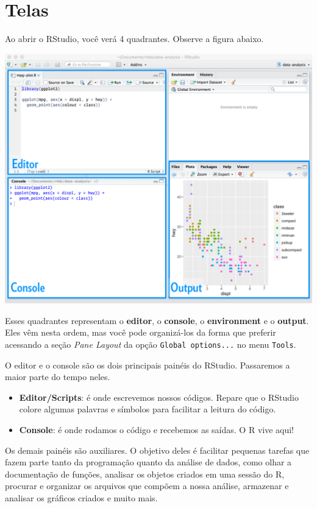 \documentclass[]{book}
\providecommand{\tightlist}{%
  \setlength{\itemsep}{0pt}\setlength{\parskip}{0pt}}
\begin{document}
\hypertarget{telas}{%
\section{Telas}\label{telas}}

Ao abrir o RStudio, você verá 4 quadrantes. Observe a figura abaixo.

\begin{center}\includegraphics[width=56.24in]{img/rstudio/rstudio-editor} \end{center}

Esses quadrantes representam o \textbf{editor}, o \textbf{console}, o \textbf{environment} e o \textbf{output}. Eles vêm nesta ordem, mas você pode organizá-los da forma que preferir acessando a seção \emph{Pane Layout} da opção \texttt{Global\ options...} no menu \texttt{Tools}.

O editor e o console são os dois principais painéis do RStudio. Passaremos a maior parte do tempo neles.

\begin{itemize}
\tightlist
\item
  \textbf{Editor/Scripts}: é onde escrevemos nossos códigos. Repare que o RStudio colore algumas palavras e símbolos para facilitar a leitura do código.
\item
  \textbf{Console}: é onde rodamos o código e recebemos as saídas. O R vive aqui!
\end{itemize}

Os demais painéis são auxiliares. O objetivo deles é facilitar pequenas tarefas que fazem parte tanto da programação quanto da análise de dados, como olhar a documentação de funções, analisar os objetos criados em uma sessão do R, procurar e organizar os arquivos que compõem a nossa análise, armazenar e analisar os gráficos criados e muito mais.
\end{document}
